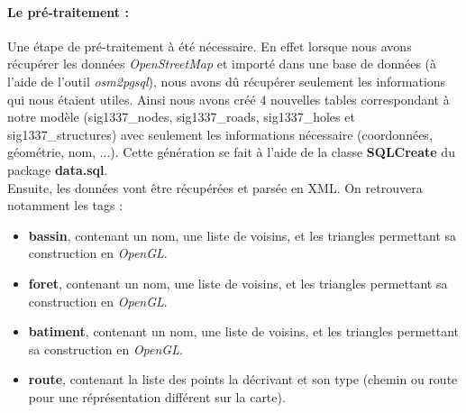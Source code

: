 \documentclass[12pt,a4paper,oneside]{article}
\begin{document}
\paragraph{Le pré-traitement : \\}
Une étape de pré-traitement à été nécessaire. En effet lorsque nous avons récupérer les données \textit{OpenStreetMap} et importé dans une base de données (à l'aide de l'outil \textit{osm2pgsql}), nous avons dû récupérer seulement les informations qui nous étaient utiles. Ainsi nous avons créé 4 nouvelles tables correspondant à notre modèle (sig1337\_nodes, sig1337\_roads, sig1337\_holes et sig1337\_structures) avec seulement les informations nécessaire (coordonnées, géométrie, nom, ...). Cette génération se fait à l'aide de la classe \textbf{SQLCreate} du package \textbf{data.sql}. \\
Ensuite, les données vont être récupérées et parsée en XML. On retrouvera notamment les tags :
\begin{itemize}
\item \textbf{bassin}, contenant un nom, une liste de voisins, et les triangles permettant sa construction en \textit{OpenGL}.
\item \textbf{foret}, contenant un nom, une liste de voisins, et les triangles permettant sa construction en \textit{OpenGL}.
\item \textbf{batiment}, contenant un nom, une liste de voisins, et les triangles permettant sa construction en \textit{OpenGL}.
\item \textbf{route}, contenant la liste des points la décrivant et son type (chemin ou route pour une réprésentation différent sur la carte).
\end{itemize}

\newpage
\end{document}
